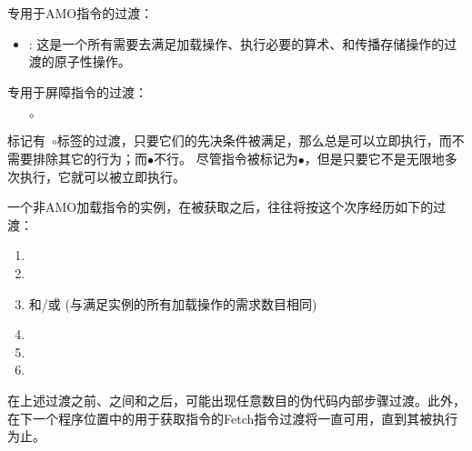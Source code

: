 \noindent 专用于AMO指令的过渡： 
\begin{itemize}
\item {}: 这是一个所有需要去满足加载操作、执行必要的算术、和传播存储操作的过渡的原子性操作。
\end{itemize}

\noindent 专用于屏障指令的过渡： %
\begin{itemize}
\item[$\circ$] 
\end{itemize}

标记有~$\circ$标签的过渡，只要它们的先决条件被满足，那么总是可以立即执行，而不需要排除其它的行为；而$\bullet$不行。
尽管指令被标记为$\bullet$，但是只要它不是无限地多次执行，它就可以被立即执行。

一个非AMO加载指令的实例，在被获取之后，往往将按这个次序经历如下的过渡：
\begin{enumerate}
\item {}
\item {}
\item {} 和/或  (与满足实例的所有加载操作的需求数目相同)
\item {}
\item {}
\item {}
\end{enumerate}
在上述过渡之前、之间和之后，可能出现任意数目的伪代码内部步骤过渡。此外，在下一个程序位置中的用于获取指令的Fetch指令过渡将一直可用，直到其被执行为止。

